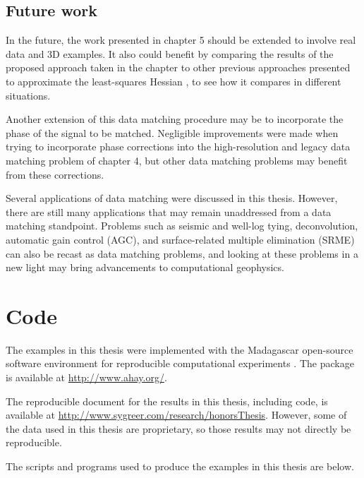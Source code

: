 \subsection{Future work}
In the future, the work presented in chapter 5 should be extended to involve real data and 3D examples. 
It also could benefit by comparing the results of the proposed approach taken in the chapter to other previous approaches presented to approximate the least-squares Hessian \cite[]{migdec,lsamp,siklsm,pwlsrtm,diagamp,debfilt,prestack,poststack}, to see how it compares in different situations.

Another extension of this data matching procedure may be to incorporate
the phase of the signal to be matched. 
Negligible improvements were made when trying to incorporate phase corrections into the high-resolution and legacy data matching problem of chapter 4, but other data matching problems may benefit from these corrections.

Several applications of data matching were discussed in this thesis. 
However, there are still many applications that may remain unaddressed from a data matching standpoint. 
Problems such as seismic and well-log tying, deconvolution, automatic gain control (AGC), and surface-related multiple elimination (SRME) can also be recast as data matching problems, and looking at these problems in a new light may bring advancements to computational geophysics.



\appendix
\section{Code}
The examples in this thesis were implemented with the Madagascar open-source software environment for reproducible computational experiments \cite[]{madagascar}.
The package is available at \url{http://www.ahay.org/}.

The reproducible document for the results in this thesis, including code, is available at \url{http://www.sygreer.com/research/honorsThesis}.
However, some of the data used in this thesis are proprietary, so those results may not directly be reproducible.

The scripts and programs used to produce the examples in this thesis are below.


